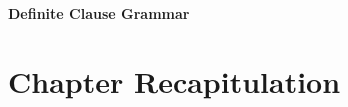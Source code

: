 \documentclass[thesis-solanki.tex]{subfiles}
\begin{document}
\paragraph{Definite Clause Grammar}





\section{Chapter Recapitulation}

\ifMain
\begin{scope}
  \nolinenumbers
  \enotesize
  \par
  \begin{singlespace}
  \setlength{\parskip}{12pt plus 2pt minus 1pt}
  \theendnotes
  \par
  \end{singlespace}
\end{scope}
\fi
\end{document}
